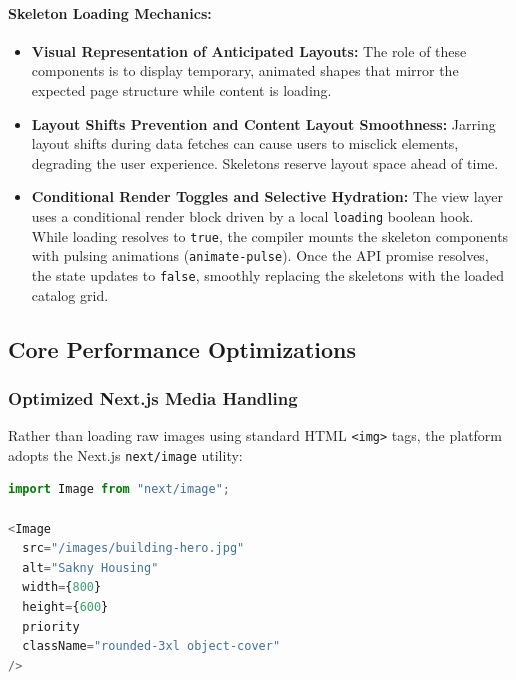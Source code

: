 \documentclass[12pt,a4paper]{article}
\begin{document}
\paragraph{Skeleton Loading Mechanics:}
\begin{itemize}[leftmargin=2em]
    \item \textbf{Visual Representation of Anticipated Layouts:} The role of these components is to display temporary, animated shapes that mirror the expected page structure while content is loading.
    \item \textbf{Layout Shifts Prevention and Content Layout Smoothness:} Jarring layout shifts during data fetches can cause users to misclick elements, degrading the user experience. Skeletons reserve layout space ahead of time.
    \item \textbf{Conditional Render Toggles and Selective Hydration:} The view layer uses a conditional render block driven by a local \texttt{loading} boolean hook. While loading resolves to \texttt{true}, the compiler mounts the skeleton components with pulsing animations (\texttt{animate-pulse}). Once the API promise resolves, the state updates to \texttt{false}, smoothly replacing the skeletons with the loaded catalog grid.
\end{itemize}

\subsection{Core Performance Optimizations}

\subsubsection{Optimized Next.js Media Handling}

Rather than loading raw images using standard HTML \texttt{<img>} tags, the platform adopts the Next.js \texttt{next/image} utility:

\begin{lstlisting}[language=TypeScript,title={Optimized Image Loader Component}]
import Image from "next/image";

<Image
  src="/images/building-hero.jpg"
  alt="Sakny Housing"
  width={800}
  height={600}
  priority
  className="rounded-3xl object-cover"
/>
\end{lstlisting}
\end{document}
